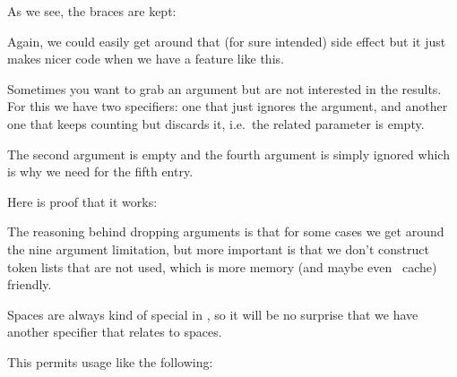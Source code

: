 \typebuffer[definition][option=TEX] \getbuffer[definition]

As we see, the braces are kept:

\startbuffer[example]
\macro [1]
\macro [{1}]
\stopbuffer

\typebuffer[example][option=TEX]

Again, we could easily get around that (for sure intended) side effect but it just makes nicer
code when we have a feature like this.

\getbuffer[example]

Sometimes you want to grab an argument but are not interested in the results. For this we have
two specifiers: one that just ignores the argument, and another one that keeps counting but
discards it, i.e.\ the related parameter is empty.

\startbuffer[definition]
\stopbuffer

\typebuffer[definition][option=TEX] \getbuffer[definition]

The second argument is empty and the fourth argument is simply ignored which is why we need
 for the fifth entry.

\startbuffer[example]
\macro [1][2][3][4][5]
\stopbuffer

\typebuffer[example][option=TEX]

Here is proof that it works:

\getbuffer[example]

The reasoning behind dropping arguments is that for some cases we get around the
nine argument limitation, but more important is that we don't construct token
lists that are not used, which is more memory (and maybe even \CPU\ cache)
friendly.

Spaces are always kind of special in \TEX, so it will be no surprise that we have
another specifier that relates to spaces.

\startbuffer[definition]
\stopbuffer

\typebuffer[definition][option=TEX] \getbuffer[definition]

This permits usage like the following:

\startbuffer[example]
\macro [1][2]
\macro [1] [2]
\stopbuffer

\typebuffer[example][option=TEX] \getbuffer[example]

